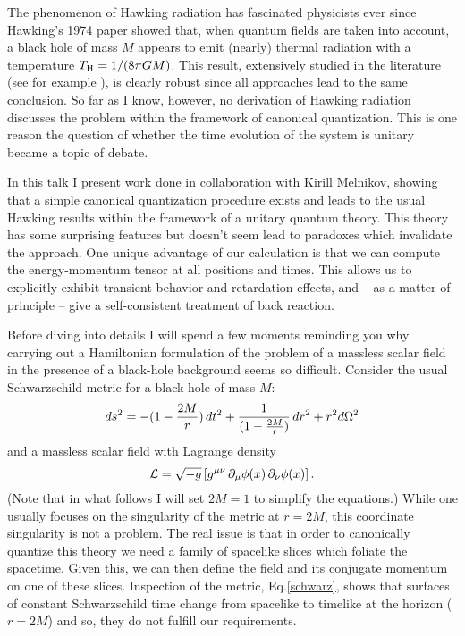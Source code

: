 \documentclass[12pt]{article}
\begin{document}
The phenomenon of Hawking radiation has fascinated physicists
ever since Hawking's 1974 paper\cite{hawking} showed that, when
quantum fields are taken into account,
a black hole of mass $M$ appears to emit (nearly) thermal radiation with a temperature 
$T_{\rm H} = 1/(8\pi G M)$.  This result, extensively studied in the literature
(see for example \cite{unruh,jacobson,parikh}), is clearly
robust since all approaches lead to the same conclusion.
So far as I know, however, no derivation of Hawking
radiation discusses the problem within the framework of canonical quantization.
This is one reason the question of whether the time evolution of
the system is unitary became a topic of debate.

In this talk I present work\cite{bhlett} done in collaboration with Kirill Melnikov,
showing that a simple canonical quantization procedure exists and
leads to the usual Hawking results within the framework of a unitary
quantum theory.  This theory has some surprising
features but doesn't seem lead to paradoxes which invalidate the approach.
One unique advantage of our calculation is that we can compute the energy-momentum
tensor at all positions and times.  This allows us to explicitly
exhibit transient behavior and retardation effects, and --
as a matter of principle -- give a self-consistent treatment 
of back reaction.

Before diving into details I will spend a few moments reminding you why
carrying out a Hamiltonian formulation of the problem
of a massless scalar field in the presence of a black-hole background
seems so difficult.  Consider the usual Schwarzschild metric for a
black hole of mass $M$:
\begin{equation}
	ds^2 = -(1-{2M\over r})\,dt^2 + {1\over (1- {2M\over r})}\,dr^2 + r^2 d\Omega^2
\label{schwarz}
\end{equation}
and a massless scalar field with Lagrange density
\begin{equation}
	{\cal L} = \sqrt{-g} \left[ g^{\mu \nu} \,\partial_\mu \phi(x)\,
	 \partial_\nu \phi(x) \right] .
\end{equation}
(Note that in what follows I will set $2M = 1$ to simplify the equations.)
While one usually focuses on the singularity of the metric
at $r=2M$, this coordinate singularity is not a problem.  The real 
issue is that in order to canonically quantize this theory we need a family of
spacelike slices which foliate the spacetime.  Given this, we can then define 
the field and its conjugate momentum on one of these slices.
Inspection of the metric, Eq.\ref{schwarz}, shows that surfaces of constant
Schwarzschild time change from spacelike to timelike at the horizon ($r=2M$)
and so, they do not fulfill our requirements.  
\end{document}
